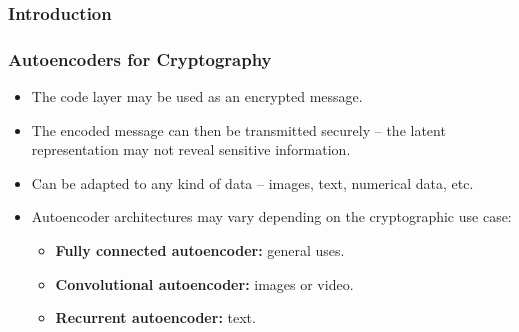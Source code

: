 \documentclass{beamer}
\begin{document}
\begin{frame}
    \frametitle{Introduction}
    \centering
    
\end{frame}

\begin{frame}
    \frametitle{Autoencoders for Cryptography}
    \begin{itemize}
        \item The code layer may be used as an encrypted message.
        \item The encoded message can then be transmitted securely -- the latent representation may not reveal sensitive information.
        \item Can be adapted to any kind of data -- images, text, numerical data, etc.
        \item Autoencoder architectures may vary depending on the cryptographic use case:
        \begin{itemize}
            \item \textbf{Fully connected autoencoder:} general uses.
            \item \textbf{Convolutional autoencoder:} images or video.
            \item \textbf{Recurrent autoencoder:} text.
        \end{itemize}
    \end{itemize}
\end{frame}
\end{document}
